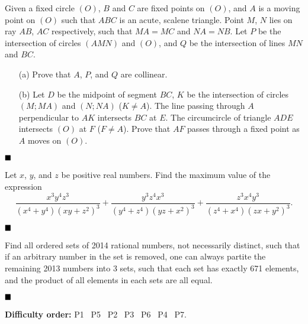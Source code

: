 \documentclass[11pt]{article}
\newenvironment{solution}[1][Solution]{%
  \proof[\normalfont \faPenNib \hspace{0.2cm} \ttfamily \scshape \large #1]%
}{\(\hfill \blacksquare\){\parfillskip0pt\par}}
\theoremstyle{definition}
\begin{document}
        \begin{problem}
            Given a fixed circle \((O)\), \(B\) and \(C\) are fixed points on \((O)\), and \(A\) is a moving point on \((O)\) such that \(ABC\) is an acute, scalene triangle. Point \(M\), \(N\) lies on ray \(AB\), \(AC\) respectively, such that \(MA = MC\) and \(NA = NB\). Let \(P\) be the intersection of circles \((AMN)\) and \((O)\), and \(Q\) be the intersection of lines \(MN\) and \(BC\).
            \begin{enumerate}
                \item[(a)] Prove that \(A\), \(P\), and \(Q\) are collinear.
                \item[(b)] Let \(D\) be the midpoint of segment \(BC\), \(K\) be the intersection of circles \((M;MA)\) and \((N;NA)\) (\(K \neq A\)). The line passing through \(A\) perpendicular to \(AK\) intersects \(BC\) at \(E\). The circumcircle of triangle \(ADE\) intersects \((O)\) at \(F\) (\(F \neq A\)). Prove that \(AF\) passes through a fixed point as \(A\) moves on \((O)\).
            \end{enumerate}
        \end{problem}

        \begin{solution}
            
        \end{solution}

        \newpage

        \begin{problem}
            Let \(x\), \(y\), and \(z\) be positive real numbers. Find the maximum value of the expression
            \[\frac{x^3y^4z^3}{(x^4 + y^4)(xy + z^2)^3} + \frac{y^3z^4x^3}{(y^4 + z^4)(yz + x^2)^3} + \frac{z^3x^4y^3}{(z^4 + x^4)(zx + y^2)^3}.\]
        \end{problem}

        \begin{solution}
            
        \end{solution}

        \newpage

        \begin{problem}
            Find all ordered sets of 2014 rational numbers, not necessarily distinct, such that if an arbitrary number in the set is removed, one can always partite the remaining 2013 numbers into 3 sets, such that each set has exactly 671 elements, and the product of all elements in each sets are all equal.
        \end{problem}

        \begin{solution}
            
        \end{solution}

        \textbf{Difficulty order:} P1 \textrightarrow \ P5 \textrightarrow \ P2 \textrightarrow \ P3 \textrightarrow \ P6 \textrightarrow \ P4 \textrightarrow \ P7.
\end{document}
